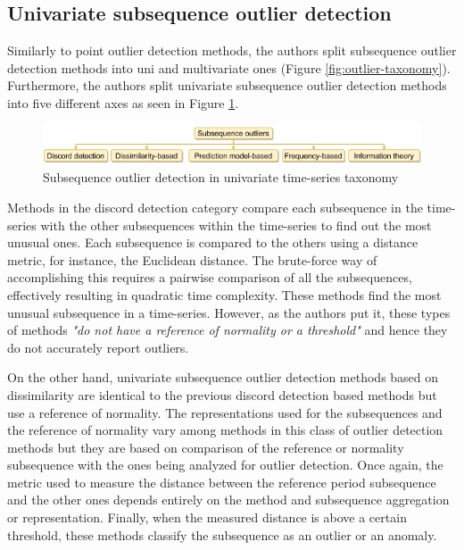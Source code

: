 \subsection*{Univariate subsequence outlier detection}
Similarly to point outlier detection methods, the authors split subsequence outlier detection methods into uni and multivariate ones (Figure \ref{fig:outlier-taxonomy}). Furthermore, the authors split univariate subsequence outlier detection methods into five different axes as seen in Figure \ref{fig:subsequence-outlier-taxonomy}.

\begin{figure}[!htb]
  \begin{center}
    \includegraphics[scale=0.8]{figures/taxonomy-subsequence-outlier-uni.png}
    \caption{Subsequence outlier detection in univariate time-series taxonomy}
    \label{fig:subsequence-outlier-taxonomy}
  \end{center}
\end{figure}

Methods in the discord detection category compare each subsequence in the time-series with the other subsequences within the time-series to find out the most unusual ones. Each subsequence is compared to the others using a distance metric, for instance, the Euclidean distance. The brute-force way of accomplishing this requires a pairwise comparison of all the subsequences, effectively resulting in quadratic time complexity. These methods find the most unusual subsequence in a time-series. However, as the authors put it, these types of methods \textit{"do not have a reference of normality or a threshold"} and hence they do not accurately report outliers.

On the other hand, univariate subsequence outlier detection methods based on dissimilarity are identical to the previous discord detection based methods but use a reference of normality. The representations used for the subsequences and the reference of normality vary among methods in this class of outlier detection methods but they are based on comparison of the reference or normality subsequence with the ones being analyzed for outlier detection. Once again, the metric used to measure the distance between the reference period subsequence and the other ones depends entirely on the method and subsequence aggregation or representation. Finally, when the measured distance is above a certain threshold, these methods classify the subsequence as an outlier or an anomaly.


